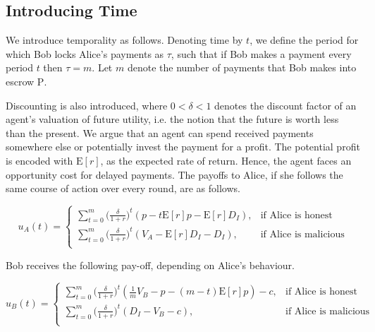 \documentclass[runningheads]{llncs}
\newcommand{\rk}[1]{\todo[linecolor=red,backgroundcolor=red!25,bordercolor=blue,inline,caption={}]{Comment by Rami: #1}}
\begin{document}
\subsection{Introducing Time}
We introduce temporality as follows.
Denoting time by $t$, we define the period for which Bob locks Alice's payments as $\tau$, such that if Bob makes a payment every period $t$ then $\tau=m$.
Let $m$ denote the number of payments that Bob makes into escrow $\mathrm{P}$.

Discounting is also introduced, where $0<\delta<1$ denotes the discount factor of an agent's valuation of future utility, i.e. the notion that the future is worth less than the present.
We argue that an agent can spend received payments somewhere else or potentially invest the payment for a profit.
The potential profit is encoded with $\mathrm{E}[r]$, as the expected rate of return.
Hence, the agent faces an opportunity cost for delayed payments.
The payoffs to Alice, if she follows the same course of action over every round, are as follows. 

\begin{equation}
\label{eq:time_alice}
u_A(t) = 
\begin{cases}
    \sum_{t=0}^{m} \big( \frac{\delta}{1+r} \big)^{t} ( p - t\mathrm{E}[r]p -\mathrm{E}[r]D_{I}), & \text{if Alice is honest} \\
    \sum_{t=0}^{m} \big( \frac{\delta}{1+r} \big)^{t} (V_A - \mathrm{E}[r]D_{I}-D_{I}), & \text{if Alice is malicious} \\
\end{cases}
\end{equation}




Bob receives the following pay-off, depending on Alice's behaviour.

\begin{equation}
\label{eq:time_bob}
u_B (t) = 
\begin{cases}
    \sum_{t=0}^{m} \big( \frac{\delta}{1+r} \big)^t (\frac{1}{m} V_B - p - (m-t)\mathrm{E}[r]p) - c, & \text{if Alice is honest} \\
\sum_{t=0}^{m} \big( \frac{\delta}{1+r} \big)^t (D_{I} -V_B -c) , & \text{if Alice is malicious} \\
\end{cases}
\end{equation}
\end{document}
